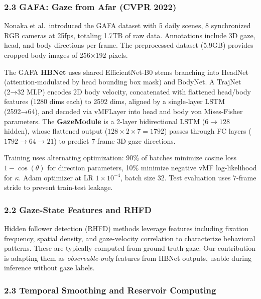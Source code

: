 \documentclass[
]{article}
\begin{document}
\hypertarget{gafa-gaze-from-afar-cvpr-2022}{%
\subsubsection{2.3 GAFA: Gaze from Afar (CVPR
2022)}\label{gafa-gaze-from-afar-cvpr-2022}}

Nonaka et al.~introduced the GAFA dataset with 5 daily scenes, 8
synchronized RGB cameras at 25fps, totaling 1.7TB of raw data.
Annotations include 3D gaze, head, and body directions per frame. The
preprocessed dataset (5.9GB) provides cropped body images of 256×192
pixels.

The GAFA \textbf{HBNet} uses shared EfficientNet-B0 stems branching into
HeadNet (attention-modulated by head bounding box mask) and BodyNet. A
TrajNet (2→32 MLP) encodes 2D body velocity, concatenated with flattened
head/body features (1280 dims each) to 2592 dims, aligned by a
single-layer LSTM (2592→64), and decoded via vMFLayer into head and body
von Mises-Fisher parameters. The \textbf{GazeModule} is a 2-layer
bidirectional LSTM (\(6 \to 128\) hidden), whose flattened output
(\(128 \times 2 \times 7 = 1792\)) passes through FC layers
(\(1792 \to 64 \to 21\)) to predict 7-frame 3D gaze directions.

Training uses alternating optimization: 90\% of batches minimize cosine
loss \(1 - \cos(\theta)\) for direction parameters, 10\% minimize
negative vMF log-likelihood for \(\kappa\). Adam optimizer at LR
\(1 \times 10^{-4}\), batch size 32. Test evaluation uses 7-frame stride
to prevent train-test leakage.

\hypertarget{gaze-state-features-and-rhfd}{%
\subsubsection{2.2 Gaze-State Features and
RHFD}\label{gaze-state-features-and-rhfd}}

Hidden follower detection (RHFD) methods leverage features including
fixation frequency, spatial density, and gaze-velocity correlation to
characterize behavioral patterns. These are typically computed from
ground-truth gaze. Our contribution is adapting them as
\emph{observable-only} features from HBNet outputs, usable during
inference without gaze labels.

\hypertarget{temporal-smoothing-and-reservoir-computing}{%
\subsubsection{2.3 Temporal Smoothing and Reservoir
Computing}\label{temporal-smoothing-and-reservoir-computing}}
\end{document}
